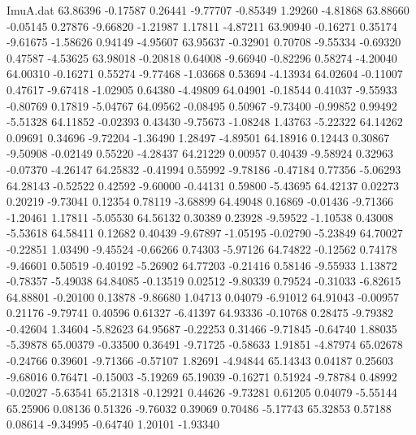 \begin{filecontents}{ImuA.dat}
  63.86396   -0.17587    0.26441   -9.77707   -0.85349    1.29260   -4.81868
  63.88660   -0.05145    0.27876   -9.66820   -1.21987    1.17811   -4.87211
  63.90940   -0.16271    0.35174   -9.61675   -1.58626    0.94149   -4.95607
  63.95637   -0.32901    0.70708   -9.55334   -0.69320    0.47587   -4.53625
  63.98018   -0.20818    0.64008   -9.66940   -0.82296    0.58274   -4.20040
  64.00310   -0.16271    0.55274   -9.77468   -1.03668    0.53694   -4.13934
  64.02604   -0.11007    0.47617   -9.67418   -1.02905    0.64380   -4.49809
  64.04901   -0.18544    0.41037   -9.55933   -0.80769    0.17819   -5.04767
  64.09562   -0.08495    0.50967   -9.73400   -0.99852    0.99492   -5.51328
  64.11852   -0.02393    0.43430   -9.75673   -1.08248    1.43763   -5.22322
  64.14262    0.09691    0.34696   -9.72204   -1.36490    1.28497   -4.89501
  64.18916    0.12443    0.30867   -9.50908   -0.02149    0.55220   -4.28437
  64.21229    0.00957    0.40439   -9.58924    0.32963   -0.07370   -4.26147
  64.25832   -0.41994    0.55992   -9.78186   -0.47184    0.77356   -5.06293
  64.28143   -0.52522    0.42592   -9.60000   -0.44131    0.59800   -5.43695
  64.42137    0.02273    0.20219   -9.73041    0.12354    0.78119   -3.68899
  64.49048    0.16869   -0.01436   -9.71366   -1.20461    1.17811   -5.05530
  64.56132    0.30389    0.23928   -9.59522   -1.10538    0.43008   -5.53618
  64.58411    0.12682    0.40439   -9.67897   -1.05195   -0.02790   -5.23849
  64.70027   -0.22851    1.03490   -9.45524   -0.66266    0.74303   -5.97126
  64.74822   -0.12562    0.74178   -9.46601    0.50519   -0.40192   -5.26902
  64.77203   -0.21416    0.58146   -9.55933    1.13872   -0.78357   -5.49038
  64.84085   -0.13519    0.02512   -9.80339    0.79524   -0.31033   -6.82615
  64.88801   -0.20100    0.13878   -9.86680    1.04713    0.04079   -6.91012
  64.91043   -0.00957    0.21176   -9.79741    0.40596    0.61327   -6.41397
  64.93336   -0.10768    0.28475   -9.79382   -0.42604    1.34604   -5.82623
  64.95687   -0.22253    0.31466   -9.71845   -0.64740    1.88035   -5.39878
  65.00379   -0.33500    0.36491   -9.71725   -0.58633    1.91851   -4.87974
  65.02678   -0.24766    0.39601   -9.71366   -0.57107    1.82691   -4.94844
  65.14343    0.04187    0.25603   -9.68016    0.76471   -0.15003   -5.19269
  65.19039   -0.16271    0.51924   -9.78784    0.48992   -0.02027   -5.63541
  65.21318   -0.12921    0.44626   -9.73281    0.61205    0.04079   -5.55144
  65.25906    0.08136    0.51326   -9.76032    0.39069    0.70486   -5.17743
  65.32853    0.57188    0.08614   -9.34995   -0.64740    1.20101   -1.93340

\end{filecontents}
